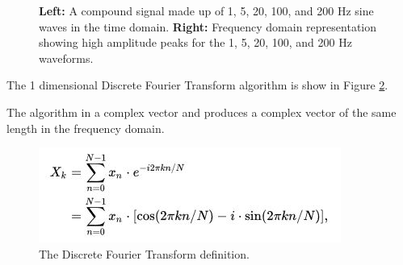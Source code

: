 \documentclass[11pt,a4paper]{article}
\begin{document}
\begin{figure}[H]%
    \centering
    \qquad
    \vspace{5pt}
    \caption{\textbf{Left:} A compound signal made up of 1, 5, 20, 100, and 200 Hz sine waves in the time domain. \textbf{Right:} Frequency domain representation showing high amplitude peaks for the 1, 5, 20, 100, and 200 Hz waveforms.}%
    \label{fig:gridwatch}%
\end{figure}

The 1 dimensional Discrete Fourier Transform algorithm is show in Figure \ref{fig:dft_algorithm}.

The algorithm in a complex vector and produces a complex vector of the same length in the frequency domain.

\begin{figure}[H]
\begin{center}
\includegraphics[scale=1]{dft_algorithm}
\end{center}
\caption{The Discrete Fourier Transform definition.}
\label{fig:dft_algorithm}
\end{figure}
\end{document}
